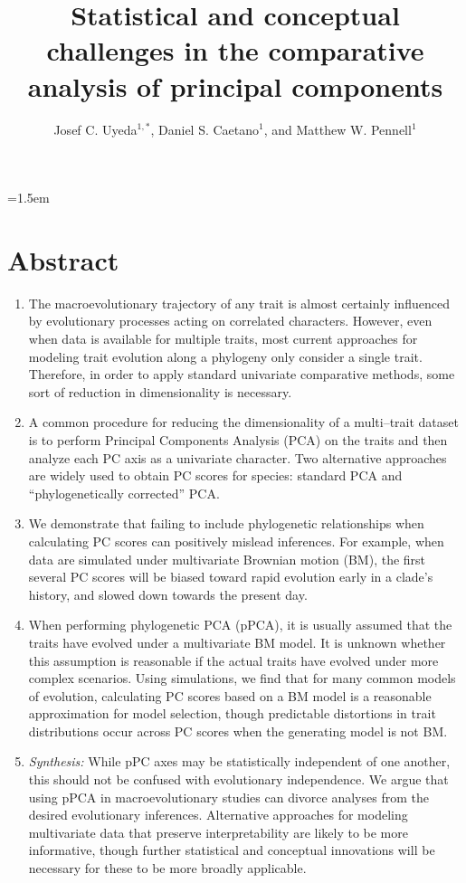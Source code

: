 \documentclass[a4paper,12pt]{article}
\title{Statistical and conceptual challenges in the comparative analysis of principal components}
\author{
Josef C. Uyeda$^{1,*}$, Daniel S. Caetano$^1$, and Matthew W. Pennell$^1$
}
\date{}
\affiliation{
 $^{1}$ Department of Biological Sciences \& Institute for Bioinformatics and Evolutionary Studies, University of Idaho, Moscow, ID 83844, U.S.A.\\ 
 $^{*}$ Email for correspondence: \texttt{josef.uyeda@gmail.com}\\
}
\begin{document}
\mstitlepage
\parindent=1.5em
\addtolength{\parskip}{.3em}
\vfill

\section{Abstract}
\begin{enumerate}
\item The macroevolutionary trajectory of any trait is almost certainly influenced by evolutionary processes acting on correlated characters. However, even when data is available for multiple traits, most current approaches for modeling trait evolution along a phylogeny only consider a single trait. Therefore, in order to apply standard univariate comparative methods, some sort of reduction in dimensionality is necessary.

\item A common procedure for reducing the dimensionality of a multi--trait dataset is to perform Principal Components Analysis (PCA) on the traits and then analyze each PC axis as a univariate character. Two alternative approaches are widely used to obtain PC scores for species: standard PCA and ``phylogenetically corrected'' PCA. 

\item We demonstrate that failing to include phylogenetic relationships when calculating PC scores can positively mislead inferences. For example, when data are simulated under multivariate Brownian motion (BM), the first several PC scores will be biased toward rapid evolution early in a clade's history, and slowed down towards the present day.

\item When performing phylogenetic PCA (pPCA), it is usually assumed that the traits have evolved under a multivariate BM model. It is unknown whether this assumption is reasonable if the actual traits have evolved under more complex scenarios. Using simulations, we find that for many common models of evolution, calculating PC scores based on a BM model is a reasonable approximation for model selection, though predictable distortions in trait distributions occur across PC scores when the generating model is not BM.

\item \emph{Synthesis:} While pPC axes may be statistically independent of one another, this should not be confused with evolutionary independence. We argue that using pPCA in macroevolutionary studies can divorce analyses from the desired evolutionary inferences. Alternative approaches for modeling multivariate data that preserve interpretability are likely to be more informative, though further statistical and conceptual innovations will be necessary for these to be more broadly applicable.
\end{enumerate} 
\end{document}
